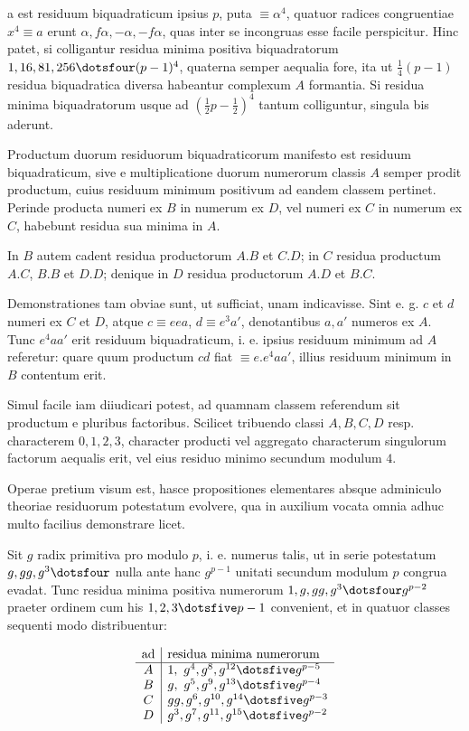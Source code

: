 %
a est residuum biquadraticum ipsius $p$, puta $\equiv\alpha^4$, quatuor radices congruentiae $x^4\equiv a$ erunt $\alpha,f\alpha,-\alpha,-f\alpha$, quas inter se incongruas esse facile perspicitur. Hinc patet, si colligantur residua minima positiva biquadratorum $1,16,81,256\dotsfour(p-1)^4$, quaterna semper aequalia fore, ita ut $\tfrac14(p-1)$ residua biquadratica diversa habeantur complexum $A$ formantia. Si residua minima biquadratorum usque ad $(\tfrac12p-\tfrac12)^4$ tantum colliguntur, singula bis aderunt.

Productum duorum residuorum biquadraticorum manifesto est residuum biquadraticum, sive e multiplicatione duorum numerorum classis $A$ semper prodit productum, cuius residuum minimum positivum ad eandem classem pertinet. Perinde producta numeri ex $B$ in numerum ex $D$, vel numeri ex $C$ in numerum ex $C$, habebunt residua sua minima in $A$.

In $B$ autem cadent residua productorum $A.B$ et $C.D$; in $C$ residua productum $A.C$, $B.B$ et $D.D$; denique in $D$ residua productorum $A.D$ et $B.C$.

Demonstrationes tam obviae sunt, ut sufficiat, unam indicavisse. Sint e. g. $c$ et $d$ numeri ex $C$ et $D$, atque $c\equiv eea$, $d\equiv e^3a'$, denotantibus $a,a'$ numeros ex $A$. Tunc $e^4aa'$ erit residuum biquadraticum, i. e. ipsius residuum minimum ad $A$ referetur: quare quum productum $cd$ fiat $\equiv e.e^4aa'$, illius residuum minimum in $B$ contentum erit.

Simul facile iam diiudicari potest, ad quamnam classem referendum sit productum e pluribus factoribus. Scilicet tribuendo classi $A,B,C,D$ resp. characterem $0,1,2,3$, character producti vel aggregato characterum singulorum factorum aequalis erit, vel eius residuo minimo secundum modulum $4$.

Operae pretium visum est, hasce propositiones elementares absque adminiculo theoriae residuorum potestatum evolvere, qua in auxilium vocata omnia adhuc multo facilius demonstrare licet.

Sit $g$ radix primitiva pro modulo $p$, i. e. numerus talis, ut in serie potestatum $g,gg,g^3\dotsfour$ nulla ante hanc $g^{p-1}$ unitati secundum modulum $p$ congrua evadat. Tunc residua minima positiva numerorum $1,g,gg,g^3\dotsfour g^{p-2}$ praeter ordinem cum his $1,2,3\dotsfive p-1$ convenient, et in quatuor classes sequenti modo distribuentur:

%
\[
\begin{array}{c|l}
\text{ad}&\text{residua minima numerorum}\\\hline
A&1,\ g^4,g^8,g^{12}\dotsfive g^{p-5}\\
B&g,\ g^5,g^9,g^{13}\dotsfive g^{p-4}\\
C&gg,g^6,g^{10},g^{14}\dotsfive g^{p-3}\\
D&g^3,g^7,g^{11},g^{15}\dotsfive g^{p-2}
\end{array}
\]

